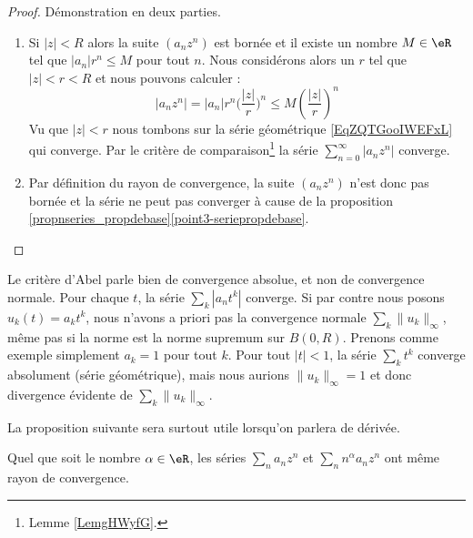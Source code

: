 \begin{proof}
    Démonstration en deux parties.
    \begin{enumerate}
        \item

            Si \( | z |<R\) alors la suite \( (a_nz^n)\) est bornée et il existe un nombre \( M\in \eR\) tel que \( | a_n |r^n\leq M\) pour tout \( n\). Nous considérons alors un \( r\) tel que \( | z |<r<R\) et nous pouvons calculer :
            \begin{equation}
                | a_nz^n |=| a_n |r^n\big( \frac{ | z | }{ r } \big)^n\leq M\left( \frac{ | z | }{ r } \right)^n
            \end{equation}
            Vu que \( | z |<r\) nous tombons sur la série géométrique \eqref{EqZQTGooIWEFxL} qui converge. Par le critère de comparaison\footnote{Lemme \ref{LemgHWyfG}.} la série \( \sum_{n=0}^{\infty}| a_nz^n |\) converge.

        \item
            Par définition du rayon de convergence, la suite \( (a_nz^n)\) n'est donc pas bornée et la série ne peut pas converger à cause de la proposition \ref{propnseries_propdebase}\ref{point3-seriepropdebase}.
    \end{enumerate}
\end{proof}

Le critère d'Abel parle bien de convergence absolue, et non de convergence normale. Pour chaque \( t\), la série \( \sum_k | a_nt^k |\) converge. Si par contre nous posons \( u_k(t)=a_kt^k\), nous n'avons a priori pas la convergence normale \( \sum_k\| u_k \|_{\infty}\), même pas si la norme est la norme supremum sur \( B(0,R)\). Prenons comme exemple simplement \( a_k=1\) pour tout \( k\). Pour tout \( | t |<1\), la série \( \sum_k t^k\) converge absolument (série géométrique), mais nous aurions \( \| u_k \|_{\infty}=1\) et donc divergence évidente de \( \sum_k\| u_k \|_{\infty}\).

La proposition suivante sera surtout utile lorsqu'on parlera de dérivée.
\begin{proposition}        \label{PropHDIUooKTbVSX}
    Quel que soit le nombre \( \alpha\in \eR\), les séries \( \sum_na_nz^n\) et \( \sum_nn^{\alpha}a_nz^n\) ont même rayon de convergence.
\end{proposition}

